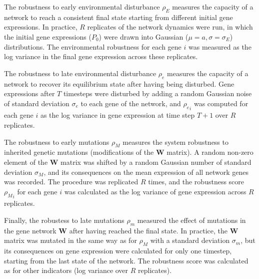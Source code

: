 \documentclass[10pt,a4paper]{article}
\newcommand{\earlyenv}{{\rho_E}}
\newcommand{\lateenv}{{\rho_e}}
\newcommand{\earlymut}{{\rho_M}}
\newcommand{\latemut}{{\rho_m}}
\begin{document}
The robustness to early environmental disturbance $\earlyenv$ measures the capacity of a network to reach a consistent final state starting from different initial gene expressions. In practice, $R$ replicates of the network dynamics were run, in which the initial gene expressions ($P_0$) were drawn into Gaussian ($\mu = a, \sigma = \sigma_E$) distributions. The environmental robustness for each gene $i$ was measured as the log variance in the final gene expression across these replicates. 

The robustness to late environmental disturbance $\lateenv$ measures the capacity of a network to recover its equilibrium state after having being disturbed. Gene expressions after $T$ timesteps were disturbed by adding a random Gaussian noise of standard deviation $\sigma_e$ to each gene of the network, and $\lateenv_i$ was computed for each gene $i$ as the log variance in gene expression at time step $T+1$ over $R$ replicates. 

The robustness to early mutations $\earlymut$ measures the system robustness to inherited genetic mutations (modifications of the $\bm W$ matrix). A random non-zero element of the $\bm W$ matrix was shifted by a random Gaussian number of standard deviation $\sigma_M$, and its consequences on the mean expression of all network genes was recorded. The procedure was replicated $R$ times, and the robustness score $\earlymut_i$ for each gene $i$ was calculated as the log variance of gene expression across $R$ replicates. 

Finally, the robustess to late mutations $\latemut$ measured the effect of mutations in the gene network $\bm W$ after having reached the final state. In practice, the $\bm W$ matrix was mutated in the same way as for $\earlymut$ with a standard deviation $\sigma_m$, but its consequences on gene expression were calculated for only one timestep, starting from the last state of the network. The robustness score was calculated as for other indicators (log variance over $R$ replicates).
\end{document}
